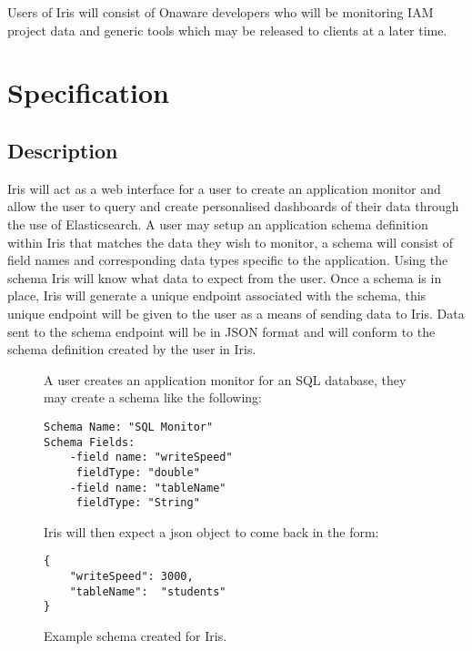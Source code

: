\documentclass[12pt,a4paper,titlepage]{report}
\newcommand{\q}[1]{``#1''}
\begin{document}
Users of Iris will consist of Onaware developers who will be monitoring IAM project data and generic tools which may be released to clients at a later time.


\chapter{Specification}

\section{Description}

Iris will act as a web interface for a user to create an application monitor and allow the user to query and create personalised dashboards of their data through the use of Elasticsearch. A user may setup an application schema definition within Iris that matches the data they wish to monitor, a schema will consist of field names and corresponding data types specific to the application. Using the schema Iris will know what data to expect from the user. Once a schema is in place, Iris will generate a unique endpoint associated with the schema, this unique endpoint will be given to the user as a means of sending data to Iris. Data sent to the schema endpoint will be in JSON format and will conform to the schema definition created by the user in Iris.
\begin{figure}[H]
\begin{tcolorbox}
A user creates an application monitor for an SQL database, they may create a schema like the following:

\begin{verbatim}
Schema Name: "SQL Monitor"
Schema Fields:
    -field name: "writeSpeed"
     fieldType: "double"
    -field name: "tableName"
     fieldType: "String"
\end{verbatim}	
Iris will then expect a json object to come back in the form:
\begin{verbatim}
{
	"writeSpeed": 3000,
	"tableName":  "students"
}
\end{verbatim}
\end{tcolorbox}
\caption{Example schema created for Iris.}
\end{figure}
\end{document}
